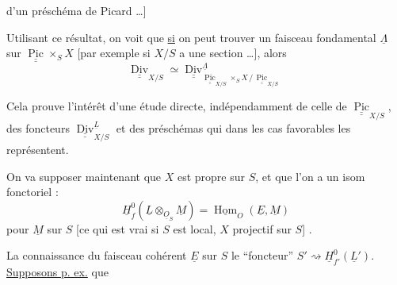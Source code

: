 d'un préschéma de Picard \ldots] 

Utilisant ce résultat, on voit que \uline{si} on peut trouver un faisceau  fondamental  $\underline\Lambda$ sur $\underline{\underline{\operatorname{Pic}}}\times_S X$  [par exemple si $X/S$ a une section \ldots], alors 
\[
\underline{\underline{\operatorname{Div}}}_{X/S}\simeq
\underline{\underline{\operatorname{Div}}}^{\underline\Lambda}_{\underline{\underline{\operatorname{Pic}}}_{X/S}\times_S X\,/\,\underline{\underline{\operatorname{Pic}}}_{X/S}}
\]

Cela prouve l'intérêt d'une étude directe, indépendamment de celle de $\underline{\underline{\operatorname{Pic}}}_{X/S}$, des foncteurs  $\underline{\underline{\operatorname{Div}}}_{X/S}^{\underline L}$ et des  préschémas qui dans les cas favorables les représentent.

On va supposer maintenant que $X$ est propre  sur $S$, et que l'on a un isom fonctoriel :
\[
\underline H_f^0(\underline L\otimes_{\underline O_S}\underline M)=\underline{\operatorname{Hom}}_{O}(\underline E,\underline M)
\]
pour $\underline M$  sur $S$ [ce qui est vrai si $S$ est local,  $X$ projectif sur $S$] \deleted{\unsure{$X$ quasi libre sur $S$} \ldots]}.

La connaissance du faisceau cohérent $\underline E$ sur $S$  le ``foncteur'' $S'\rightsquigarrow\underline H^0_{f'}(\underline L')$. \uline{Supposons p. ex.} que
